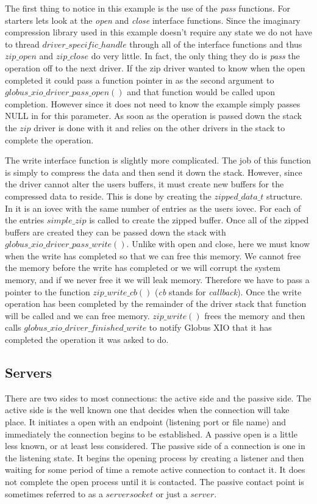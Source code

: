 \documentclass[11pt]{article}
\begin{document}
The first thing to notice in this example is the use of the \emph{pass}
functions.  For starters lets look at the \emph{open} and \emph{close}
interface functions.  Since the imaginary compression library used in this
example doesn't require any state we do not have to thread 
$driver\_specific\_handle$ through all of the interface functions and thus
$zip\_open$ and $zip\_close$ do very little.  In fact, the only thing they
do is \emph{pass} the operation off to the next driver.  If the zip driver
wanted to know when the open completed it could pass a function
pointer in as the second argument to $globus\_xio\_driver\_pass\_open()$ and
that function would be called upon completion.  However since it does
not need to know the example simply passes NULL in for this parameter.
As soon as the operation is passed down the stack the $zip$ driver is 
done with it and relies on the other drivers in the stack to complete
the operation.

The write interface function is slightly more complicated.  The job of
this function is simply to compress the data and then send it down the stack.
However, since the driver cannot alter the users buffers, it must create
new buffers for the compressed data to reside.  This is done by creating
the $zipped\_data\_t$ structure.  In it is an iovec with the same number 
of entries as the users iovec.  For each of the entries $simple\_zip$ is
called to create the zipped buffer.  Once all of the zipped buffers are
created they can be passed down the stack with 
$globus\_xio\_driver\_pass\_write()$.  Unlike with open and close, here we
must know when the write has completed so that we can free this
memory.  We cannot free the memory before the write has completed or
we will corrupt the system memory, and if we never free it we will leak
memory.  Therefore we have to pass a pointer to the function 
$zip\_write\_cb()$ (\emph{cb} stands for \emph{callback}).  Once the
write operation has been completed by the remainder of the driver stack
that function will be called and we can free memory.  $zip\_write()$ frees
the memory and then calls $globus\_xio\_driver\_finished\_write$ to notify
Globus XIO that it has completed the operation it was asked to do.

\subsection{Servers}
There are two sides to most connections: the active side and the passive side.
The active side is the well known one that decides when the connection
will take place.  It initiates a open with an endpoint (listening port 
or file name) and immediately the connection begins to be established.
A passive open is a little less known, or at least less considered.  The
passive side of a connection is one in the listening state.  It begins
the opening process by creating a listener and then waiting for some
period of time a remote active connection to contact it.  It does not
complete the open process until it is contacted.  The passive contact
point is sometimes referred to as a $server socket$ or just a $server$.
\end{document}
